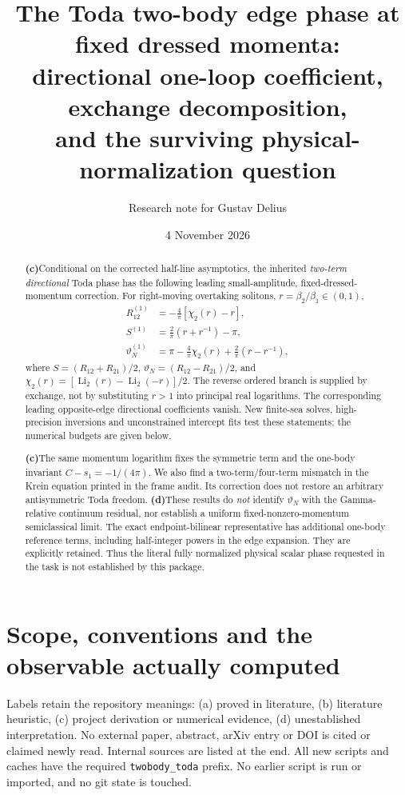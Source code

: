 \documentclass[11pt,a4paper]{article}
\title{The Toda two-body edge phase at fixed dressed momenta:\\
directional one-loop coefficient, exchange decomposition,\\
and the surviving physical-normalization question}
\author{Research note for Gustav Delius}
\date{4 November 2026}
\newcommand{\C}{\textbf{(c)}\nobreakspace}
\newcommand{\D}{\textbf{(d)}\nobreakspace}
\newcommand{\file}[1]{\nolinkurl{#1}}
\begin{document}
\maketitle
\begin{abstract}
\C Conditional on the corrected half-line asymptotics, the inherited
\emph{two-term directional} Toda phase has the following leading
small-amplitude, fixed-dressed-momentum correction. For right-moving
overtaking solitons, $r=\beta_2/\beta_1\in(0,1)$,
\begin{align*}
 R_{12}^{(1)}&=-\frac4\pi[\chi_2(r)-r],\\
 S^{(1)}&=\frac2\pi(r+r^{-1})-\pi,\\
 \vartheta_N^{(1)}&=\pi-\frac4\pi\chi_2(r)+\frac2\pi(r-r^{-1}),
\end{align*}
where $S=(R_{12}+R_{21})/2$, $\vartheta_N=(R_{12}-R_{21})/2$, and
$\chi_2(r)=[\operatorname{Li}_2(r)-\operatorname{Li}_2(-r)]/2$.
The reverse ordered branch is supplied by exchange, not by substituting
$r>1$ into principal real logarithms. The corresponding leading
opposite-edge directional coefficients vanish. New finite-sea solves,
high-precision inversions and unconstrained intercept fits test these
statements; the numerical budgets are given below.

\C The same momentum logarithm fixes the symmetric term and the one-body
invariant $C-s_1=-1/(4\pi)$. We also find a two-term/four-term mismatch
in the Krein equation printed in the frame audit. Its correction does not
restore an arbitrary antisymmetric Toda freedom.
\D These results do \emph{not} identify $\vartheta_N$ with the
Gamma-relative continuum residual, nor establish a uniform fixed-nonzero-momentum
semiclassical limit. The exact endpoint-bilinear representative has additional
one-body reference terms, including half-integer powers in the edge expansion.
They are explicitly retained. Thus the literal fully normalized physical
scalar phase requested in the task is not established by this package.
\end{abstract}

\section{Scope, conventions and the observable actually computed}
Labels retain the repository meanings: (a) proved in literature, (b)
literature heuristic, (c) project derivation or numerical evidence, (d)
unestablished interpretation. No external paper, abstract, arXiv entry or DOI
is cited or claimed newly read. Internal sources are listed at the end.
All new scripts and caches have the required \file{twobody_toda} prefix.
No earlier script is run or imported, and no git state is touched.
\end{document}
